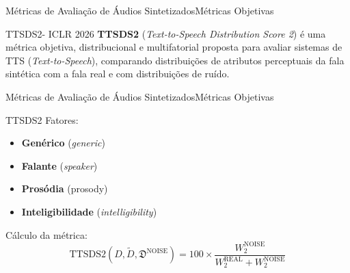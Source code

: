 \begin{frame}{Métricas de Avaliação de Áudios Sintetizados}{Métricas Objetivas}
  \begin{block}{TTSDS2- ICLR 2026}
    \textbf{TTSDS2} (\textit{Text-to-Speech Distribution Score 2}) \cite{TTSDS2} é uma
    métrica objetiva, distribucional e multifatorial proposta para avaliar sistemas de
    TTS (\textit{Text-to-Speech}), comparando distribuições de atributos perceptuais da
    fala sintética com a fala real e com distribuições de ruído.
  \end{block}
\end{frame}

\begin{frame}{Métricas de Avaliação de Áudios Sintetizados}{Métricas Objetivas}
  \begin{block}{TTSDS2}
    Fatores:
    \begin{itemize}
      \item \textbf{Genérico} (\textit{generic})
      \item \textbf{Falante} (\textit{speaker})
      \item \textbf{Prosódia} (\textit{}{prosody})
      \item \textbf{Inteligibilidade} (\textit{intelligibility})
    \end{itemize}
    Cálculo da métrica:
    \[
      \text{TTSDS2}(D, \tilde{D}, \mathfrak{D}^{\text{NOISE}}) = 100 \times
      \frac{W_2^\text{NOISE}}{W_2^\text{REAL} + W_2^\text{NOISE}}
    \]
  \end{block}
\end{frame}
